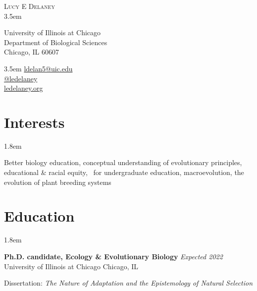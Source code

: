 \documentclass[]{article}
\begin{document}
\BgThispage
\pagestyle{alldocument}

{\fontsize{20}{64}\selectfont \textsc{Lucy E Delaney}}\\
\leftskip 3.5em
\begin{multicols}{2}

University of Illinois at Chicago\\
Department of Biological Sciences\\
Chicago, IL 60607

\columnbreak

\begin{flushright}
\rightskip 3.5em
\href{mailto:ldelan5@uic.edu}{ldelan5@uic.edu} \textcolor{light-gray}{\faPaperPlane}\\
\href{https://github.com/ledelaney}{@ledelaney} \textcolor{light-gray}{\faGithub}\\
\href{https://ledelaney.org}{ledelaney.org} \textcolor{light-gray}{\faDesktop}
\end{flushright}

\end{multicols}

\vspace{3mm}

\section{Interests}
\vspace{3mm}

\leftskip 1.8em

Better biology education, conceptual understanding of evolutionary principles, educational \& racial equity, \textcolor{light-gray}{\faRProject}\ for undergraduate education, macroevolution, the evolution of plant breeding systems

\vspace{3mm}
\section{Education}

\vspace{3mm}
\leftskip 1.8em

\textbf{Ph.D. candidate, Ecology \& Evolutionary Biology} \hfill \textit{Expected 2022}\\ 
University of Illinois at Chicago \hfill Chicago, IL
     
Dissertation: \emph{The Nature of Adaptation and the Epistemology of Natural Selection} 
\vspace{0.3cm}
\end{document}
